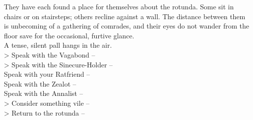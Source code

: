 They have each found a place for themselves about the rotunda. Some sit in chairs or on stairsteps; others recline against a wall. The distance between them is unbecoming of a gathering of comrades, and their eyes do not wander from the floor save for the occasional, furtive glance.\\

A tense, silent pall hangs in the air.\\

> Speak with the Vagabond -- \\
> Speak with the Sinecure-Holder -- \\
 Speak with your Ratfriend -- \\
 Speak with the Zealot -- \\
 Speak with the Annalist -- \\
> Consider something vile -- \\
> Return to the rotunda -- 
